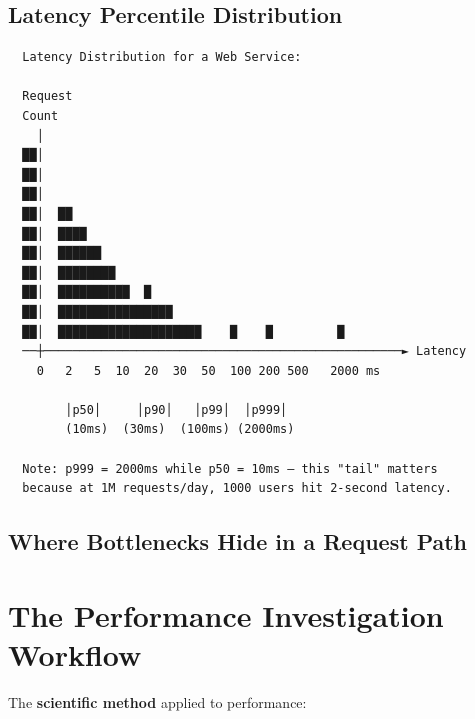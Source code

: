\documentclass[11pt]{article}
\begin{document}
\subsection{Latency Percentile Distribution}\label{latency-percentile-distribution}

\setcodelang{}

\begin{verbatim}
  Latency Distribution for a Web Service:

  Request
  Count
    │
  ██│
  ██│
  ██│
  ██│  ██
  ██│  ████
  ██│  ██████
  ██│  ████████
  ██│  ██████████  █
  ██│  ████████████████
  ██│  ████████████████████    █    █         █
  ──┼──────────────────────────────────────────────────► Latency
    0   2   5  10  20  30  50  100 200 500   2000 ms

        │p50│     │p90│   │p99│  │p999│
        (10ms)  (30ms)  (100ms) (2000ms)

  Note: p999 = 2000ms while p50 = 10ms — this "tail" matters
  because at 1M requests/day, 1000 users hit 2-second latency.
\end{verbatim}

\subsection{Where Bottlenecks Hide in a Request Path}\label{where-bottlenecks-hide-in-a-request-path}


\section{The Performance Investigation Workflow}\label{the-performance-investigation-workflow}

The \textbf{scientific method} applied to performance:

\setcodelang{}
\end{document}
